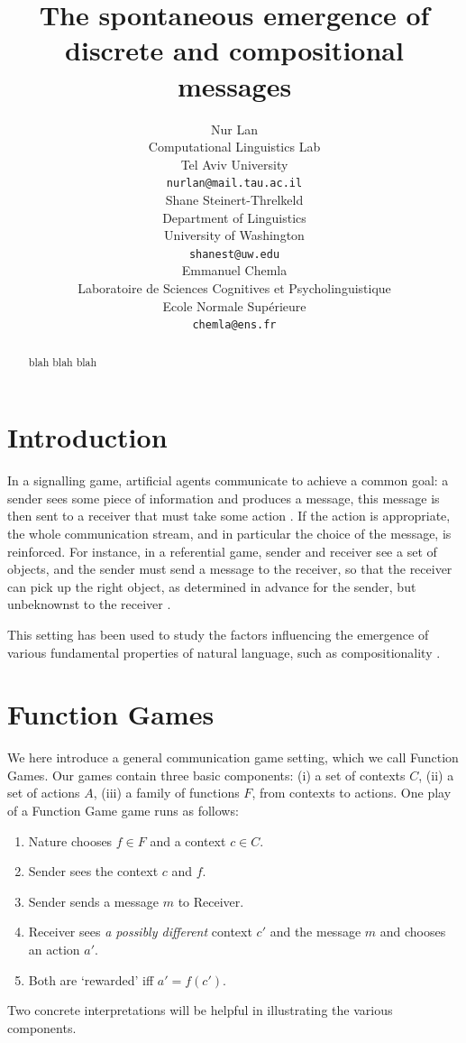 \documentclass[11pt,a4paper]{article}
\title{The spontaneous emergence of discrete and compositional messages}
\author{Nur Lan \\
  Computational Linguistics Lab \\
  Tel Aviv University \\
  \texttt{nurlan@mail.tau.ac.il} \\\And
  Shane Steinert-Threlkeld \\
  Department of Linguistics \\
  University of Washington \\
  \texttt{shanest@uw.edu} \\\And
  Emmanuel Chemla \\
  Laboratoire de Sciences Cognitives et Psycholinguistique \\
  Ecole Normale Sup\'erieure \\
  \texttt{chemla@ens.fr}}
\date{}
\newcommand{\nbSST}[1]{{\leavevmode\color{violet}{\scriptsize#1}}}
\begin{document}
\maketitle

\begin{abstract}
	blah blah blah
\end{abstract}

\section{Introduction}

In a signalling game, artificial agents communicate to achieve a common goal: a sender sees some piece of information and produces a message, this message is then sent to a receiver that must take some action \citep{Lewis1969, Skyrms2010}. If the action is appropriate, the whole communication stream, and in particular the choice of the message, is reinforced. For instance, in a referential game, sender and receiver see a set of objects, and the sender must send a message to the receiver, so that the receiver can pick up the right object, as determined in advance for the sender, but unbeknownst to the receiver \citep{Lazaridou2017, Lazaridou2018, Havrylov2017, Chaabouni2019a}.

This setting has been used to study the factors influencing the emergence of various fundamental properties of natural language, such as compositionality \citep{Kirby2015, Franke2016, SteinertThrelkeld2016, Mordatch2018, Lazaridou2018, Choi2018}.

\section{Function Games}

We here introduce a general communication game setting, which we call Function Games.  Our games contain three basic components: (i) a set of contexts $C$, (ii) a set of actions $A$, (iii) a family of functions $F$, from contexts to actions.  One play of a Function Game game runs as follows:
\begin{enumerate}
	\item Nature chooses $f \in F$ and a context $c \in C$.
	\item Sender sees the context $c$ and $f$. \nbSST{I like f(c) here, but f is a bit more appropriate.  What do you all think? Nur: Given the situation, f is the only choice, no?}
	\item Sender sends a message $m$ to Receiver.
	\item Receiver sees \emph{a possibly different} context $c'$ and the message $m$ and chooses an action $a'$.
	\item Both are `rewarded' iff $a' = f(c')$.
\end{enumerate}
Two concrete interpretations will be helpful in illustrating the various components.
\end{document}
